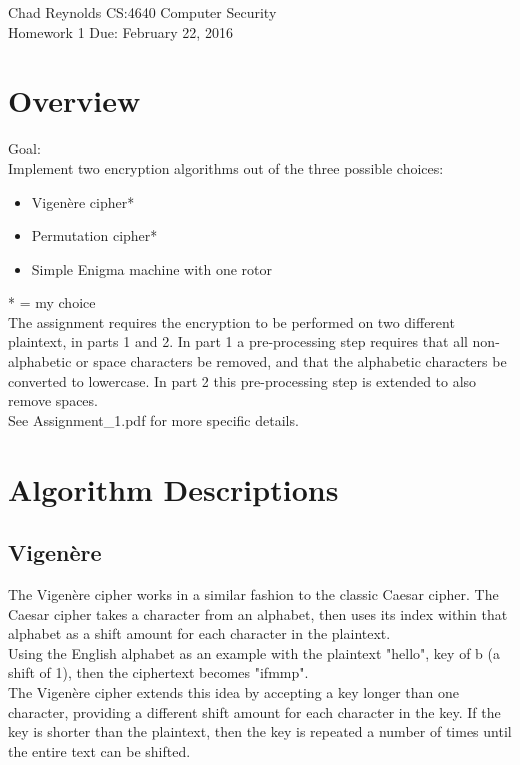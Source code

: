 \documentclass[12pt,oneside,a4paper]{article}
\begin{document}
Chad Reynolds \hfill
CS:4640 Computer Security \\
Homework 1 \hfill
Due:  February 22, 2016

\section*{Overview}
Goal: \\
Implement two encryption algorithms out of the three possible choices:
\begin{itemize}
    \item Vigenère cipher*
    \item Permutation cipher*
    \item Simple Enigma machine with one rotor
\end{itemize}
* = my choice \\

The assignment requires the encryption to be performed on two different 
plaintext, in parts 1 and 2.  In part 1 a pre-processing step requires that 
all non-alphabetic or space characters be removed, and that the 
alphabetic characters be converted to lowercase.  In part 2 this 
pre-processing step is extended to also remove spaces. \\

See Assignment\_1.pdf for more specific details. \\

\section*{Algorithm Descriptions}
\subsection*{Vigenère}
The Vigenère cipher works in a similar fashion to the classic Caesar cipher.  
The Caesar cipher takes a character from an alphabet, then uses its index 
within that alphabet as a shift amount for each character in the plaintext. \\
Using the English alphabet as an example with the plaintext "hello", key 
of b (a shift of 1), then the ciphertext becomes "ifmmp". \\

The Vigenère cipher extends this idea by accepting a key longer than one 
character, providing a different shift amount for each character in the key.  
If the key is shorter than the plaintext, then the key is repeated a number 
of times until the entire text can be shifted.
\end{document}
